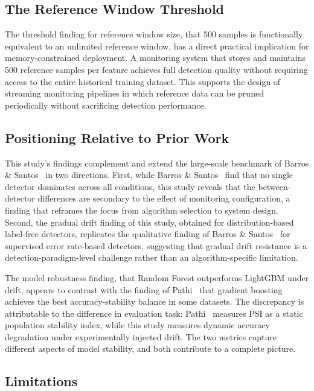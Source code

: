 \documentclass[conference]{IEEEtran}
\begin{document}
\subsection{The Reference Window Threshold}

The threshold finding for reference window size, that 500 samples is functionally equivalent to an unlimited reference window, has a direct practical implication for memory-constrained deployment. A monitoring system that stores and maintains 500 reference samples per feature achieves full detection quality without requiring access to the entire historical training dataset. This supports the design of streaming monitoring pipelines in which reference data can be pruned periodically without sacrificing detection performance.

\subsection{Positioning Relative to Prior Work}

This study's findings complement and extend the large-scale benchmark of Barros \& Santos~\cite{barros2018} in two directions. First, while Barros \& Santos~\cite{barros2018} find that no single detector dominates across all conditions, this study reveals that the between-detector differences are secondary to the effect of monitoring configuration, a finding that reframes the focus from algorithm selection to system design. Second, the gradual drift finding of this study, obtained for distribution-based label-free detectors, replicates the qualitative finding of Barros \& Santos~\cite{barros2018} for supervised error rate-based detectors, suggesting that gradual drift resistance is a detection-paradigm-level challenge rather than an algorithm-specific limitation.

The model robustness finding, that Random Forest outperforms LightGBM under drift, appears to contrast with the finding of Pathi~\cite{pathi2025} that gradient boosting achieves the best accuracy-stability balance in some datasets. The discrepancy is attributable to the difference in evaluation task: Pathi~\cite{pathi2025} measures PSI as a static population stability index, while this study measures dynamic accuracy degradation under experimentally injected drift. The two metrics capture different aspects of model stability, and both contribute to a complete picture.

\subsection{Limitations}
\end{document}
